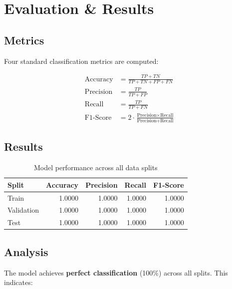 \documentclass[12pt,a4paper]{article}
\begin{document}
\section{Evaluation \& Results}

\subsection{Metrics}

Four standard classification metrics are computed:

\begin{align}
    \text{Accuracy}  &= \frac{TP + TN}{TP + TN + FP + FN} \\[6pt]
    \text{Precision} &= \frac{TP}{TP + FP} \\[6pt]
    \text{Recall}    &= \frac{TP}{TP + FN} \\[6pt]
    \text{F1-Score}  &= 2 \cdot \frac{\text{Precision} \times \text{Recall}}{\text{Precision} + \text{Recall}}
\end{align}

\subsection{Results}

\begin{table}[H]
    \centering
    \caption{Model performance across all data splits}
    \begin{tabular}{@{}lrrrr@{}}
        \toprule
        \textbf{Split} & \textbf{Accuracy} & \textbf{Precision} & \textbf{Recall} & \textbf{F1-Score} \\
        \midrule
        Train      & 1.0000 & 1.0000 & 1.0000 & 1.0000 \\
        Validation & 1.0000 & 1.0000 & 1.0000 & 1.0000 \\
        Test       & 1.0000 & 1.0000 & 1.0000 & 1.0000 \\
        \bottomrule
    \end{tabular}
\end{table}

\subsection{Analysis}

The model achieves \textbf{perfect classification} (100\%) across all splits. This indicates:
\end{document}
